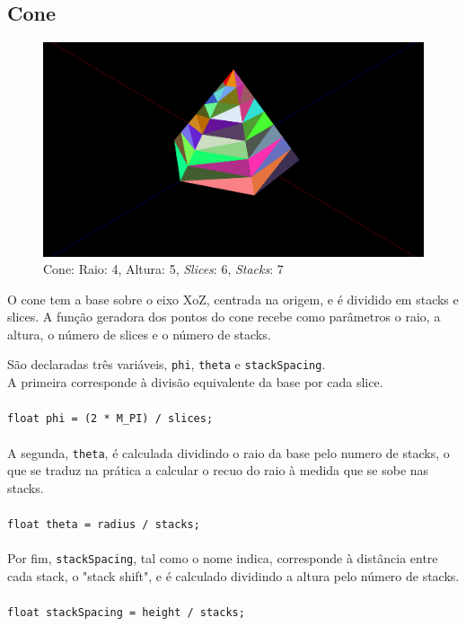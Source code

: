 \documentclass[a4paper]{article}
\begin{document}
\subsection{Cone}

\begin{figure}[H]
\centering
\includegraphics[width=0.5\linewidth]{cone.png}
\caption{Cone: Raio: 4, Altura: 5, \textit{Slices}: 6, \textit{Stacks}: 7}
\end{figure}

O cone tem a base sobre o eixo XoZ, centrada na origem, e é dividido em stacks e slices. A função geradora dos pontos do cone recebe como parâmetros o raio, a altura, o número de slices e o número de stacks.

São declaradas três variáveis, \texttt{phi}, \texttt{theta} e \texttt{stackSpacing}.
\\

A primeira corresponde à divisão equivalente da base por cada slice.
\\
\\


\texttt{float phi = (2 * M\_PI) / slices;}\\
\\

A segunda, \texttt{theta}, é calculada dividindo o raio da base pelo numero de stacks, o que se traduz na prática a calcular o recuo do raio à medida que se sobe nas stacks.
\\
\\

\texttt{float theta = radius / stacks;}\\
\\

Por fim, \texttt{stackSpacing}, tal como o nome indica, corresponde à distância entre cada stack, o "stack shift", e é calculado dividindo a altura pelo número de stacks.\\
\\


\texttt{float stackSpacing = height / stacks;}\\
\\
\end{document}
